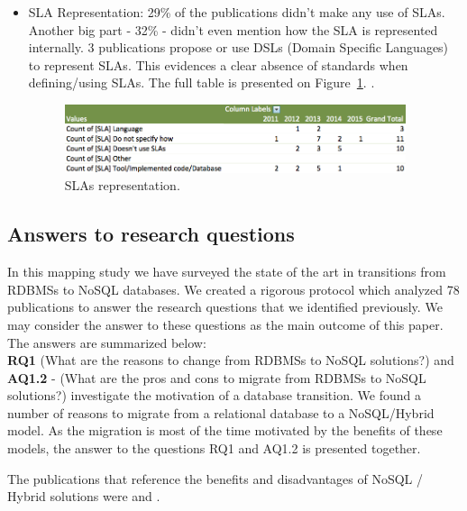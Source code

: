 \documentclass[]{tEIS2e}
\theoremstyle{plain}
\theoremstyle{remark}
\begin{document}
\begin{itemize}
\item{SLA Representation: }
29\% of the publications didn't make any use of SLAs. Another big part - 32\% - didn't even mention how the SLA is represented internally. 3 publications propose or use DSLs (Domain Specific Languages) to represent SLAs. This evidences a clear absence of standards when defining/using SLAs. The full table is presented on Figure~\ref{fig:slaRepresentation}. \citep{fullDBJson}.
\begin{figure}[htb!]
\centering
\includegraphics[width=100mm]{graph4.png}
\caption{SLAs representation.\label{fig:slaRepresentation}}
\end{figure}



\end{itemize}



\subsection{Answers to research questions}

In this mapping study we have surveyed the state of the art in transitions from RDBMSs to NoSQL databases. We created a rigorous protocol which analyzed 78 publications to answer the research questions that we identified previously. We may consider the answer to these questions as the main outcome of this paper. The answers are summarized below:
\\

\textbf{RQ1} (What are the reasons to change from RDBMSs to NoSQL solutions?)  and \textbf{AQ1.2} - (What are the pros and cons to migrate from RDBMSs to NoSQL solutions?) investigate the motivation of a database transition. We found a number of reasons to migrate from a relational database to a NoSQL/Hybrid model. As the migration is most of the time motivated by the benefits of these models, the answer to the questions RQ1 and AQ1.2 is presented together. 

 The publications that reference the benefits and disadvantages of NoSQL / Hybrid solutions  were \citep{Schram:2012:MND:2384716.2384773} \citep{buazuartransition} and \citep{gomez2014building}.
\end{document}
